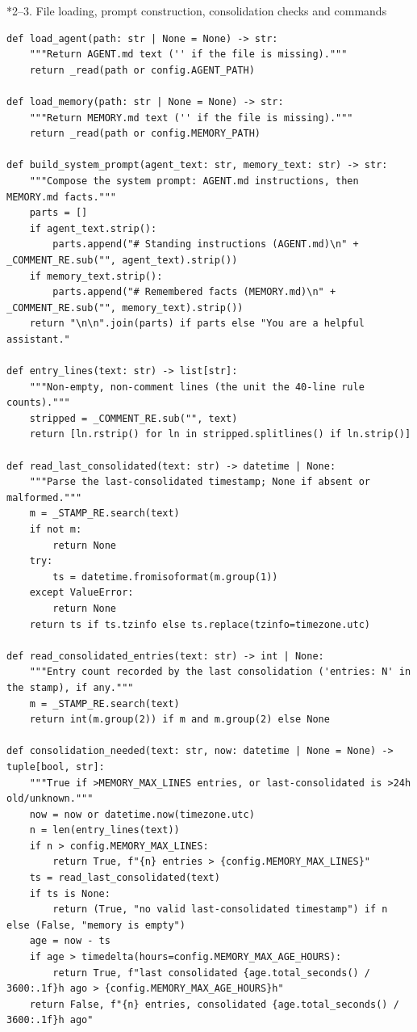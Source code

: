 \documentclass[11pt]{article}
\makeatletter
\renewcommand\subsection{\@startsection{subsection}{2}{\z@}{-2.2ex \@plus -1ex \@minus -.2ex}{0.8ex \@plus.2ex}{\normalfont\fontsize{12}{14.5}\selectfont\bfseries}}
\makeatother
\begin{document}
\subsection*{2--3. File loading, prompt construction, consolidation checks and commands}
\begingroup\lstset{basicstyle=\ttfamily\scriptsize}
\begin{lstlisting}
def load_agent(path: str | None = None) -> str:
    """Return AGENT.md text ('' if the file is missing)."""
    return _read(path or config.AGENT_PATH)

def load_memory(path: str | None = None) -> str:
    """Return MEMORY.md text ('' if the file is missing)."""
    return _read(path or config.MEMORY_PATH)

def build_system_prompt(agent_text: str, memory_text: str) -> str:
    """Compose the system prompt: AGENT.md instructions, then MEMORY.md facts."""
    parts = []
    if agent_text.strip():
        parts.append("# Standing instructions (AGENT.md)\n" + _COMMENT_RE.sub("", agent_text).strip())
    if memory_text.strip():
        parts.append("# Remembered facts (MEMORY.md)\n" + _COMMENT_RE.sub("", memory_text).strip())
    return "\n\n".join(parts) if parts else "You are a helpful assistant."

def entry_lines(text: str) -> list[str]:
    """Non-empty, non-comment lines (the unit the 40-line rule counts)."""
    stripped = _COMMENT_RE.sub("", text)
    return [ln.rstrip() for ln in stripped.splitlines() if ln.strip()]

def read_last_consolidated(text: str) -> datetime | None:
    """Parse the last-consolidated timestamp; None if absent or malformed."""
    m = _STAMP_RE.search(text)
    if not m:
        return None
    try:
        ts = datetime.fromisoformat(m.group(1))
    except ValueError:
        return None
    return ts if ts.tzinfo else ts.replace(tzinfo=timezone.utc)

def read_consolidated_entries(text: str) -> int | None:
    """Entry count recorded by the last consolidation ('entries: N' in the stamp), if any."""
    m = _STAMP_RE.search(text)
    return int(m.group(2)) if m and m.group(2) else None

def consolidation_needed(text: str, now: datetime | None = None) -> tuple[bool, str]:
    """True if >MEMORY_MAX_LINES entries, or last-consolidated is >24h old/unknown."""
    now = now or datetime.now(timezone.utc)
    n = len(entry_lines(text))
    if n > config.MEMORY_MAX_LINES:
        return True, f"{n} entries > {config.MEMORY_MAX_LINES}"
    ts = read_last_consolidated(text)
    if ts is None:
        return (True, "no valid last-consolidated timestamp") if n else (False, "memory is empty")
    age = now - ts
    if age > timedelta(hours=config.MEMORY_MAX_AGE_HOURS):
        return True, f"last consolidated {age.total_seconds() / 3600:.1f}h ago > {config.MEMORY_MAX_AGE_HOURS}h"
    return False, f"{n} entries, consolidated {age.total_seconds() / 3600:.1f}h ago"


\end{lstlisting}
\end{document}
